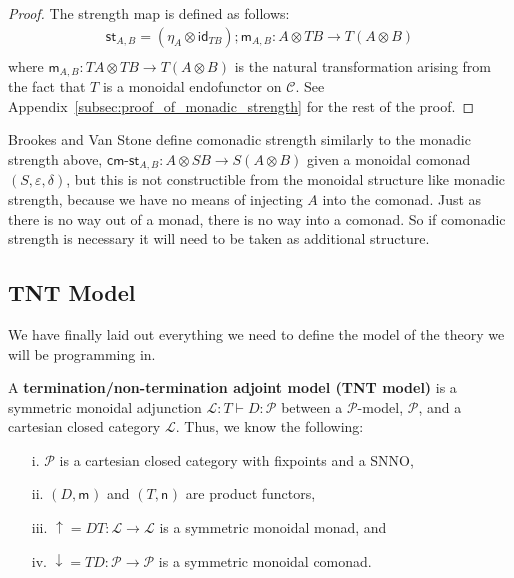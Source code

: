 \documentclass{article}
\let\mto\to
\let\to\rightarrow
\newcommand{\cat}[1]{\mathcal{#1}}
\newcommand{\uar}[0]{\mathop{\uparrow}}
\newcommand{\dar}[0]{\mathop{\downarrow}}
\newcommand{\cmst}[1]{\mathsf{cm\text{-}st}_{#1}}
\newcommand{\st}[1]{\mathsf{st}_{#1}}
\newcommand{\id}[0]{\mathsf{id}}
\newcommand{\m}[1]{\mathsf{m}_{#1}}
\newcommand{\n}[1]{\mathsf{n}_{#1}}
\begin{document}
\begin{proof}
The strength map is defined as follows:
  \[
  \begin{array}{lll}
    \st{A,B} = (\eta_{A} \otimes \id_{TB});\m{A,B} : A \otimes TB \mto T(A \otimes B)\\    
  \end{array}
  \]
  where $\m{A,B} : TA \otimes TB \mto T(A \otimes B)$ is the natural
  transformation arising from the fact that $T$ is a monoidal
  endofunctor on $\cat{C}$.  See
  Appendix~\ref{subsec:proof_of_monadic_strength} for the rest of the
  proof.
\end{proof}
Brookes and Van Stone \cite{?} define comonadic strength similarly to
the monadic strength above, $\cmst{A,B} : A \otimes SB \mto S(A
\otimes B)$ given a monoidal comonad $(S,\varepsilon,\delta)$, but
this is not constructible from the monoidal structure like monadic
strength, because we have no means of injecting $A$ into the comonad.
Just as there is no way out of a monad, there is no way into a
comonad. So if comonadic strength is necessary it will need to be
taken as additional structure.

\subsection{TNT Model}
\label{subsec:tnt_model}
We have finally laid out everything we need to define the model of the
theory we will be programming in.
\begin{definition}
  \label{def:TNT-model}
  A \textbf{termination/non-termination adjoint model (TNT model)} is
  a symmetric monoidal adjunction $\cat{L} : T \vdash D : \cat{P}$
  between a $\cat{P}$-model, $\cat{P}$, and a cartesian closed
  category $\cat{L}$.  Thus, we know the following:
  \begin{itemize}
  \item[i.] $\cat{P}$ is a cartesian closed category with fixpoints and a SNNO,
  \item[ii.] $(D,\m{})$ and $(T, \n{})$ are product functors,
  \item[iii.] $\uar = DT : \cat{L} \to \cat{L}$ is a symmetric monoidal
    monad, and
  \item[iv.] $\dar = TD : \cat{P} \to \cat{P}$ is a symmetric monoidal
    comonad.
  \end{itemize}
\end{definition}
\end{document}
